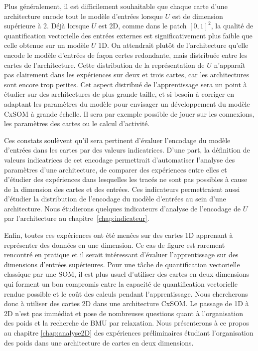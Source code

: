 \documentclass[../main]{subfiles}
\begin{document}
Plus généralement, il est difficilement souhaitable que chaque carte d'une architecture encode tout le modèle d'entrées lorsque $U$ est de dimension supérieure à 2. 
Déjà lorsque $U$ est 2D, comme dans le patch $[0,1]^2$, la qualité de quantification vectorielle des entrées externes est significativement plus faible que celle obtenue sur un modèle $U$ 1D.
On attendrait plutôt de l'architecture qu'elle encode le modèle d'entrées de façon certes redondante, mais distribuée entre les cartes de l'architecture.
Cette distribution de la représentation de $U$ n'apparaît pas clairement dans les expériences sur deux et trois cartes, car les architectures sont encore trop petites. 
Cet aspect distribué de l'apprentissage sera un point à étudier sur des architectures de plus grande taille, et si besoin à corriger en adaptant les paramètres du modèle pour envisager un développement du modèle CxSOM à grande échelle. 
Il sera par exemple possible de jouer sur les connexions, les paramètres des cartes ou le calcul d'activité.

Ces constats soulèvent qu'il sera pertinent d'évaluer l'encodage du modèle d'entrées dans les cartes par des valeurs indicatrices.
D'une part, la définition de valeurs indicatrices de cet encodage permettrait d'automatiser l'analyse des paramètres d'une architecture, de comparer des expériences entre elles et d'étudier des expériences dans lesquelles les tracés ne sont pas possibles à cause de la dimension des cartes et des entrées.
Ces indicateurs permettraient aussi d'étudier la distribution de l'encodage du modèle d'entrées au sein d'une architecture.
Nous étudierons quelques indicateurs d'analyse de l'encodage de $U$ par l'architecture au chapitre~\ref{chap:indicateur}.

Enfin, toutes ces expériences ont été menées sur des cartes 1D apprenant à représenter des données en une dimension. Ce cas de figure est rarement rencontré en pratique et il serait intéressant d'évaluer l'apprentissage sur des dimensions d'entrées supérieures. Pour une tâche de quantification vectorielle classique par une SOM, il est plus usuel d'utiliser des cartes en deux dimensions qui forment un bon compromis entre la capacité de quantification vectorielle rendue possible et le coût des calculs pendant l'apprentissage. Nous chercherons donc à utiliser des cartes 2D dans une architecture CxSOM. Le passage de 1D à 2D n'est pas immédiat et pose de nombreuses questions quant à l'organisation des poids et la recherche de BMU par relaxation. 
Nous présenterons à ce propos au chapitre \ref{chap:analyse2D} des expériences préliminaires étudiant l'organisation des poids dans une architecture de cartes en deux dimensions.

\ifSubfilesClassLoaded{
    \printbibliography
}{}
\end{document}
